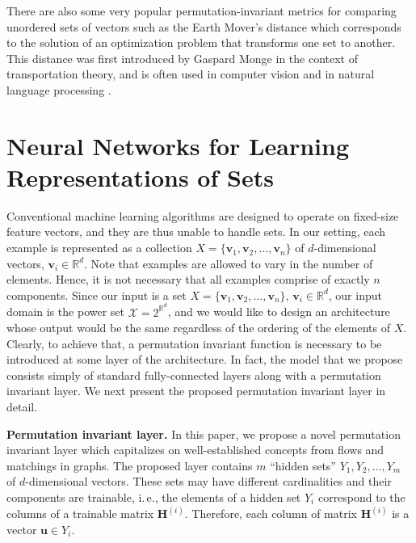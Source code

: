 \documentclass[twoside]{article}
\newcommand{\ie}{i.\,e., }
\begin{document}
There are also some very popular permutation-invariant metrics for comparing unordered sets of vectors such as the Earth Mover's distance which corresponds to the solution of an optimization problem that transforms one set to another.
This distance was first introduced by Gaspard Monge in the context of transportation theory, and is often used in computer vision \citep{rubner2000earth} and in natural language processing \citep{kusner2015word}.

\section{Neural Networks for Learning Representations of Sets}\label{sec:contribution}
Conventional machine learning algorithms are designed to operate on fixed-size feature vectors, and they are thus unable to handle sets.
In our setting, each example is represented as a collection $X = \{ \mathbf{v}_1, \mathbf{v}_2, \ldots, \mathbf{v}_n \}$ of $d$-dimensional vectors, $\mathbf{v}_i \in \mathbb{R}^d$.
Note that examples are allowed to vary in the number of elements.
Hence, it is not necessary that all examples comprise of exactly $n$ components.
Since our input is a set $X = \{ \mathbf{v}_1, \mathbf{v}_2, \ldots, \mathbf{v}_n \}$, $\mathbf{v}_i \in \mathbb{R}^d$, our input domain is the power set $\mathcal{X} = 2^{\mathbb{R}^d}$, and we would like to design an architecture whose output would be the same regardless of the ordering of the elements of $X$.
Clearly, to achieve that, a permutation invariant function is necessary to be introduced at some layer of the architecture.
In fact, the model that we propose consists simply of standard fully-connected layers along with a permutation invariant layer.
We next present the proposed permutation invariant layer in detail.


\noindent\textbf{Permutation invariant layer.}
In this paper, we propose a novel permutation invariant layer which capitalizes on well-established concepts from flows and matchings in graphs.
The proposed layer contains $m$ ``hidden sets'' $Y_1, Y_2, \ldots, Y_m$ of $d$-dimensional vectors.
These sets may have different cardinalities and their components are trainable, \ie the elements of a hidden set $Y_i$ correspond to the columns of a trainable matrix $\mathbf{H}^{(i)}$.
Therefore, each column of matrix $\mathbf{H}^{(i)}$ is a vector $\mathbf{u} \in Y_i$.

\end{document}
